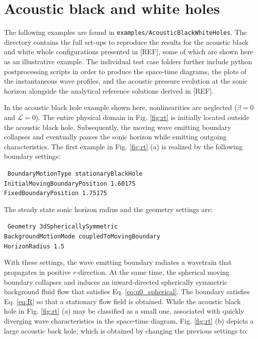 \section{Acoustic black and white holes}
\label{sec:AAcoustic black and white holes}

The following examples are found in {\tt examples/AcousticBlackWhiteHoles}. The directory contains the full set-ups to reproduce the results for the acoustic black and white whole configurations presented in [REF], some of which are shown here as an illustrative example. The individual test case folders further include python postprocessing scripts in order to produce the space-time diagrams, the plots of the instantaneous wave profiles, and the acoustic pressure evolution at the sonic horizon alongside the analytical reference solutions derived in [REF].

In the acoustic black hole example shown here, nonlinearities are neglected ($\beta=0$ and $\mathcal{L}=0$). The entire physical domain in Fig. \ref{fig:rt} is initially located outside the acoustic black hole. Subsequently, the moving wave emitting boundary collapses and eventually passes the sonic horizon while emitting outgoing characteristics. The first example in Fig. \ref{fig:rt} (a) is realized by the following boundary settings:

{\tt
BoundaryMotionType stationaryBlackHole \\
InitialMovingBoundaryPosition 1.60175 \\
FixedBoundaryPosition 1.75175
}

The steady state sonic horizon radius and the geometry settings are:

{\tt
Geometry 3dSphericallySymmetric \\
BackgroundMotionMode coupledToMovingBoundary \\
HorizonRadius 1.5
}

With these settings, the wave emitting boundary radiates a wavetrain that propagates in positive $r$-direction. At the same time, the spherical moving boundary collapses and induces an inward-directed spherically symmetric background fluid flow that satisfies Eq. \eqref{eq:u0_spherical}. The boundary satisfies Eq. \eqref{eq:R} so that a stationary flow field is obtained. While the acoustic black hole in Fig. \ref{fig:rt} (a) may be classified as a small one, associated with quickly diverging wave characteristics in the space-time diagram, Fig. \ref{fig:rt} (b) depicts a large acoustic back hole, which is obtained by changing the previous settings to:

